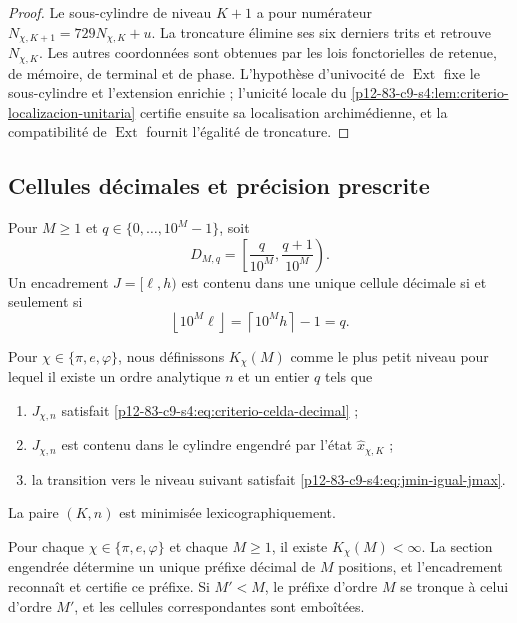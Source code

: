 \begin{proof}
Le sous-cylindre de niveau \(K+1\) a pour numérateur
\(N_{\chi,K+1}=729N_{\chi,K}+u\). La troncature élimine ses six derniers
trits et retrouve \(N_{\chi,K}\). Les autres coordonnées sont obtenues par les
lois fonctorielles de retenue, de mémoire, de terminal et de phase. L’hypothèse
d’univocité de \(\operatorname{Ext}\) fixe le sous-cylindre et l’extension
enrichie ; l’unicité locale du
\cref{p12-83-c9-s4:lem:criterio-localizacion-unitaria} certifie ensuite sa
localisation archimédienne, et la compatibilité de \(\operatorname{Ext}\)
fournit l’égalité de troncature.
\end{proof}

\subsection{Cellules décimales et précision prescrite}

Pour \(M\geq1\) et \(q\in\{0,\ldots,10^M-1\}\), soit
\[
 D_{M,q}=
 \left[
 \frac{q}{10^M},
 \frac{q+1}{10^M}
 \right).
\]
Un encadrement \(J=[\ell,h)\) est contenu dans une unique cellule décimale si
et seulement si
\begin{equation}
 \boxed{
 \left\lfloor10^M\ell\right\rfloor
 =\left\lceil10^Mh\right\rceil-1=q.}
 \label{p12-83-c9-s4:eq:criterio-celda-decimal}
\end{equation}

\begin{definition}
Pour \(\chi\in\{\pi,e,\varphi\}\), nous définissons \(K_\chi(M)\) comme le plus petit
niveau pour lequel il existe un ordre analytique \(n\) et un entier \(q\) tels
que
\begin{enumerate}
 \item \(J_{\chi,n}\) satisfait
       \eqref{p12-83-c9-s4:eq:criterio-celda-decimal} ;
 \item \(J_{\chi,n}\) est contenu dans le cylindre engendré par
       l’état \(\widehat x_{\chi,K}\) ;
 \item la transition vers le niveau suivant satisfait
       \eqref{p12-83-c9-s4:eq:jmin-igual-jmax}.
\end{enumerate}
La paire \((K,n)\) est minimisée lexicographiquement.
\end{definition}

\begin{theorem}
\label{p12-83-c9-s4:thm:precision-decimal-arbitraria}
Pour chaque \(\chi\in\{\pi,e,\varphi\}\) et chaque \(M\geq1\), il existe
\(K_\chi(M)<\infty\). La section engendrée détermine un unique préfixe décimal
de \(M\) positions, et l’encadrement reconnaît et certifie ce préfixe. Si
\(M'<M\), le préfixe d’ordre \(M\) se tronque à celui
d’ordre \(M'\), et les cellules correspondantes sont emboîtées.
\end{theorem}

